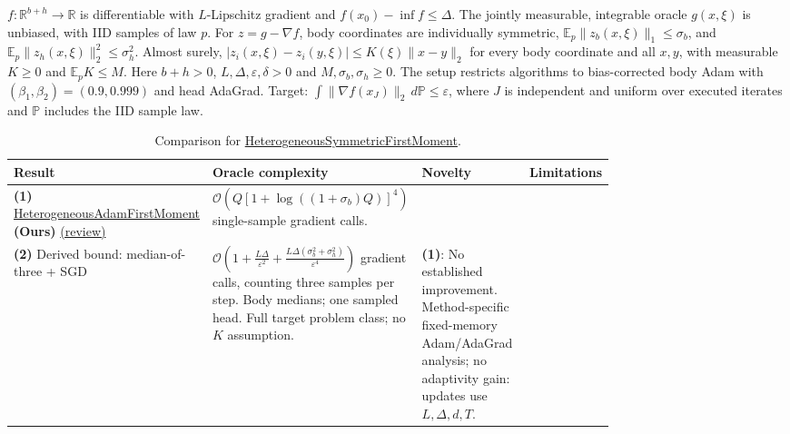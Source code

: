 \begin{table}[tp]
\centering
\caption{Comparison for \href{https://github.com/k3nfalt/longtails/blob/main/LongTails/Setups/HeterogeneousSymmetricFirstMoment.lean}{HeterogeneousSymmetricFirstMoment}.}\label{tab:HeterogeneousSymmetricFirstMoment}
\parbox{\linewidth}{\footnotesize $f:\mathbb R^{b+h}\to\mathbb R$ is differentiable with $L$-Lipschitz gradient and $f(x_0)-\inf f\le\Delta$. The jointly measurable, integrable oracle $g(x,\xi)$ is unbiased, with IID samples of law $p$. For $z=g-\nabla f$, body coordinates are individually symmetric, $\mathbb E_p\|z_b(x,\xi)\|_1\le\sigma_b$, and $\mathbb E_p\|z_h(x,\xi)\|_2^2\le\sigma_h^2$. Almost surely, $|z_i(x,\xi)-z_i(y,\xi)|\le K(\xi)\|x-y\|_2$ for every body coordinate and all $x,y$, with measurable $K\ge0$ and $\mathbb E_pK\le M$. Here $b+h>0$, $L,\Delta,\varepsilon,\delta>0$ and $M,\sigma_b,\sigma_h\ge0$. The setup restricts algorithms to bias-corrected body Adam with $(\beta_1,\beta_2)=(0.9,0.999)$ and head AdaGrad. Target: $\int\|\nabla f(x_J)\|_2\,d\mathbb P\le\varepsilon$, where $J$ is independent and uniform over executed iterates and $\mathbb P$ includes the IID sample law.}\par\smallskip
\begin{threeparttable}
\footnotesize
\setlength{\tabcolsep}{4pt}\renewcommand{\arraystretch}{1.25}
\begin{tabularx}{\linewidth}{@{}>{\raggedright\arraybackslash}p{0.20\linewidth}>{\raggedright\arraybackslash}p{0.32\linewidth}>{\raggedright\arraybackslash}p{0.25\linewidth}>{\raggedright\arraybackslash}X@{}}
\toprule
\textbf{Result} & \textbf{Oracle complexity} & \textbf{Novelty} & \textbf{Limitations} \\
\midrule
\textbf{(1)} \href{https://github.com/k3nfalt/longtails/blob/main/LongTails/Theorems/HeterogeneousAdamFirstMoment.lean}{Heterogeneous\allowbreak Adam\allowbreak First\allowbreak Moment} \textbf{(Ours)} \href{https://github.com/k3nfalt/longtails/blob/main/scripts/reviews/HeterogeneousAdamFirstMoment.md}{(review)}
& $\mathcal{O}\!\left(Q[1+\log((1+\sigma_b)Q)]^4\right)$ single-sample gradient calls.
& & \\
\midrule[1.2pt]
\textbf{(2)} Derived bound: median-of-three + SGD \citep[Cor.~2.2]{canGhadimiLan2013}
& $\mathcal{O}\!\left(1+\frac{L\Delta}{\varepsilon^2}+\frac{L\Delta(\sigma_b^2+\sigma_h^2)}{\varepsilon^4}\right)$ gradient calls, counting three samples per step. Body medians; one sampled head. Full target problem class; no $K$ assumption.
& \textbf{(1)}: No established improvement. Method-specific fixed-memory Adam/AdaGrad analysis; no adaptivity gain: updates use $L,\Delta,d,T$.

\end{tabularx}
\end{threeparttable}
\end{table}
